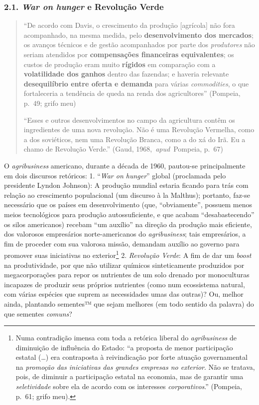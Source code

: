 \documentclass[12pt]{article}
\numberwithin{equation}{section}
\theoremstyle{plain}
\theoremstyle{definition}
\theoremstyle{remark}
\begin{document}
\hypertarget{war-on-hunger-e-revoluuxe7uxe3o-verde}{%
\subsubsection{\texorpdfstring{2.1. \textit{War on hunger} e Revolução Verde}{2.1. War on hunger e Revolução Verde}}\label{war-on-hunger-e-revoluuxe7uxe3o-verde}}

\begin{quote}
``De acordo com Davis, o crescimento da produção {[}agrícola{]} não fora acompanhado, na mesma medida, pelo \textbf{desenvolvimento dos mercados}; os avanços técnicos e de gestão acompanhados por parte dos \textit{produtores} não seriam atendidos por \textbf{compensações financeiras equivalentes}; os custos de produção eram muito \textbf{rígidos} em comparação com a \textbf{volatilidade dos ganhos} dentro das fazendas; e haveria relevante \textbf{desequilíbrio entre oferta e demanda} para várias \textit{commodities}, o que fortaleceria a tendência de queda na renda dos agricultores'' (Pompeia, p.~49; grifo meu)

``Esses e outros desenvolvimentos no campo da agricultura contêm os ingredientes de uma nova revolução. Não é uma Revolução Vermelha, como a dos soviéticos, nem uma Revolução Branca, como a do xá do Irã. Eu a chamo de Revolução Verde.'' (Gaud, 1968,~\textit{apud}~Pompeia, p.~67)
\end{quote}

O \textit{agribusiness} americano, durante a década de 1960, pautou-se principalmente em dois discursos retóricos: 1. ``\textit{War on hunger}'' global (proclamada pelo presidente Lyndon Johnson): A produção mundial estaria ficando para trás com relação ao crescimento populacional (um discurso à la Malthus); portanto, faz-se necessário que os países em desenvolvimento (que, ``obviamente'', possuem menos meios tecnológicos para produção autossuficiente, e que acabam ``desabastecendo'' os silos americanos) recebam ``um auxílio'' na direção da produção mais eficiente, dos valorosos empresários norte-americanos do \textit{agribusiness}; tais empresários, a fim de proceder com sua valorosa missão, demandam auxílio ao governo para promover suas iniciativas no exterior\footnote{Numa contradição imensa com toda a retórica liberal do \textit{agribusiness} de diminuição de influência do Estado: ``a proposta de menor participação estatal (\ldots) era contraposta à reivindicação por forte atuação governamental na \textit{promoção das iniciativas das grandes empresas no exterior}. Não se tratava, pois, de diminuir a participação estatal na economia, mas de garantir uma \textit{seletividade} sobre ela de acordo com os interesses \textit{corporativos}.'' (Pompeia, p.~61; grifo meu).} 2. \textit{Revolução Verde}: A fim de dar um \textit{boost} na produtividade, por que não utilizar químicos sinteticamente produzidos por megacorporações para repor os nutrientes de um solo drenado por monoculturas incapazes de produzir seus próprios nutrientes (como num ecossistema natural, com várias espécies que suprem as necessidades umas das outras)? Ou, melhor ainda, plantando sementes™ que sejam melhores (em todo sentido da palavra) do que sementes \textit{comuns}?
\end{document}

